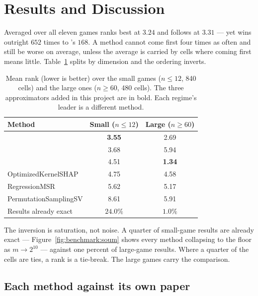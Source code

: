 \section{Results and Discussion}
\label{sec:benchmark:results}

Averaged over all eleven games \leverageshap{} ranks best at $3.24$ and \oddshap{} follows at
$3.31$ --- yet \oddshap{} wins outright $652$ times to \leverageshap{}'s $168$. A method cannot come
first four times as often and still be worse on average, unless the average is carried by cells
where coming first means little. Table~\ref{tab:benchmark:regimes} splits by dimension and the
ordering inverts.

\begin{table}[H]
    \centering
    \caption[Mean rank by dimension regime]{Mean rank (lower is better) over the small games
        ($n \le 12$, 840 cells) and the large ones ($n \ge 60$, 480 cells). The three
        approximators added in this project are in bold. Each regime's leader is a different
        method.}
    \label{tab:benchmark:regimes}
    \begin{tabular}{@{}lcc@{}}
        \toprule
        Method & Small ($n \le 12$) & Large ($n \ge 60$) \\
        \midrule
        \textbf{\leverageshap{}}   & \textbf{3.55} & 2.69 \\
        \textbf{\polyshap{}}       & 3.68          & 5.94 \\
        \textbf{\oddshap{}}        & 4.51          & \textbf{1.34} \\
        OptimizedKernelSHAP        & 4.75          & 4.58 \\
        RegressionMSR              & 5.62          & 5.17 \\
        PermutationSamplingSV      & 8.61          & 5.91 \\
        \midrule
        Results already exact      & $24.0\%$      & $1.0\%$ \\
        \bottomrule
    \end{tabular}
\end{table}

The inversion is saturation, not noise. A quarter of small-game results are already exact ---
Figure~\ref{fig:benchmark:soum} shows every method collapsing to the floor as $m \to 2^{10}$ ---
against one percent of large-game results. Where a quarter of the cells are ties, a rank is a
tie-break. The large games carry the comparison.

\subsection*{Each method against its own paper}


